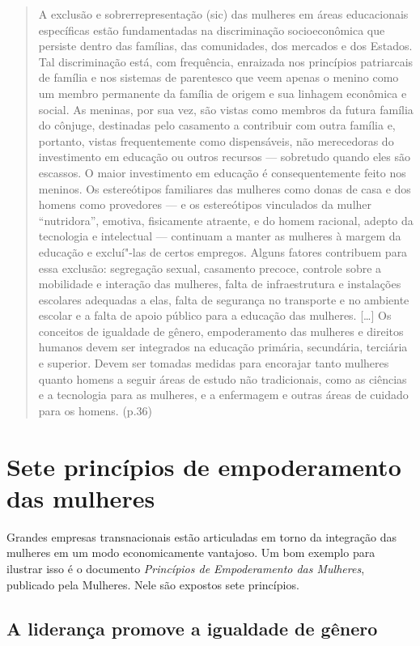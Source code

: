 \begin{quote}
A exclusão e sobrerrepresentação (sic) das mulheres em áreas
educacionais específicas estão fundamentadas na discriminação
socioeconômica que persiste dentro das famílias, das comunidades, dos
mercados e dos Estados. Tal discriminação está, com frequência,
enraizada nos princípios patriarcais de família e nos sistemas de
parentesco que veem apenas o menino como um membro permanente da família
de origem e sua linhagem econômica e social. As meninas, por sua vez,
são vistas como membros da futura família do cônjuge, destinadas pelo
casamento a contribuir com outra família e, portanto, vistas
frequentemente como dispensáveis, não merecedoras do investimento em
educação ou outros recursos --- sobretudo quando eles são escassos. O
maior investimento em educação é consequentemente feito nos meninos. Os
estereótipos familiares das mulheres como donas de casa e dos homens
como provedores --- e os estereótipos vinculados da mulher ``nutridora'',
emotiva, fisicamente atraente, e do homem racional, adepto da tecnologia
e intelectual --- continuam a manter as mulheres à margem da educação e
excluí"-las de certos empregos. Alguns fatores contribuem para essa
exclusão: segregação sexual, casamento precoce, controle sobre a
mobilidade e interação das mulheres, falta de infraestrutura e
instalações escolares adequadas a elas, falta de segurança no transporte
e no ambiente escolar e a falta de apoio público para a educação das
mulheres. {[}\ldots{}{]} Os conceitos de igualdade de gênero, empoderamento
das mulheres e direitos humanos devem ser integrados na educação
primária, secundária, terciária e superior. Devem ser tomadas medidas
para encorajar tanto mulheres quanto homens a seguir áreas de estudo não
tradicionais, como as ciências e a tecnologia para as mulheres, e a
enfermagem e outras áreas de cuidado para os homens. (p.36)
\end{quote}

\chapter{Sete princípios de empoderamento das mulheres}

Grandes empresas transnacionais estão articuladas em torno da integração
das mulheres em um modo economicamente vantajoso. Um bom exemplo para
ilustrar isso é o documento \emph{Princípios de Empoderamento das
Mulheres}, publicado pela  Mulheres. Nele são expostos sete
princípios.

\section{A liderança promove a igualdade de gênero}

